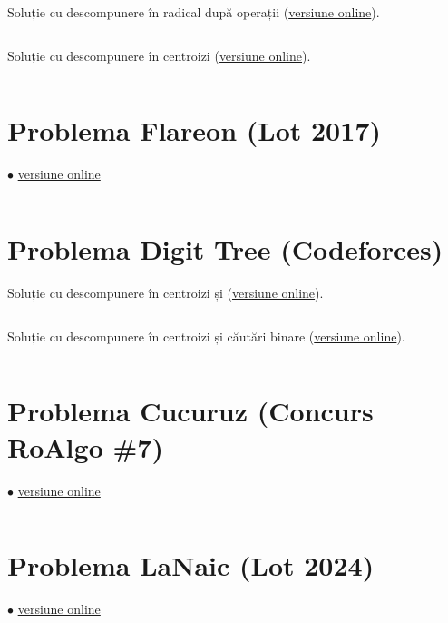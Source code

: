 \documentclass[../main.tex]{subfiles}
\begin{document}
Soluție cu descompunere în radical după operații (\href{https://codeforces.com/contest/342/submission/301066718}{versiune online}).

\inputminted{cpp}{../src/trees/xenia-and-tree-sqrt-decomp.cpp}

Soluție cu descompunere în centroizi (\href{https://codeforces.com/contest/342/submission/304223932}{versiune online}).

\inputminted{cpp}{../src/trees/xenia-and-tree-centroid-decomp.cpp}

\section{Problema Flareon (Lot 2017)}
\label{code:flareon}
$\bullet$
\href{https://kilonova.ro/submissions/544872}{versiune online}

\inputminted{cpp}{../src/trees/flareon.cpp}

\section{Problema Digit Tree (Codeforces)}
\label{code:digit-tree}

Soluție cu descompunere în centroizi și  (\href{https://codeforces.com/contest/715/submission/304248720}{versiune online}).

\inputminted{cpp}{../src/trees/digit-tree-v1.cpp}

Soluție cu descompunere în centroizi și căutări binare (\href{https://codeforces.com/contest/715/submission/301226524}{versiune online}).

\inputminted{cpp}{../src/trees/digit-tree-v2.cpp}

\section{Problema Cucuruz (Concurs RoAlgo \#7)}
\label{code:cucuruz}
$\bullet$
\href{https://kilonova.ro/submissions/1112268}{versiune online}

\inputminted{cpp}{../src/trees/cucuruz.cpp}

\section{Problema LaNaic (Lot 2024)}
\label{code:la-naic}
$\bullet$
\href{https://kilonova.ro/submissions/1162675}{versiune online}

\inputminted{cpp}{../src/trees/la-naic.cpp}
\end{document}
